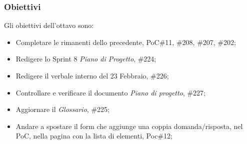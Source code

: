 \subsubsection{Obiettivi}
\label{sec:sprint8_obiettivi}
Gli obiettivi dell'ottavo  sono:
\begin{itemize}
    \item Completare le  rimanenti dello  precedente,  PoC\#11, \#208, \#207, \#202;
    \item Redigere lo Sprint 8 \textit{Piano di Progetto},  \#224;
    \item Redigere il verbale interno del 23 Febbraio,  \#226;
    \item Controllare e verificare il documento \textit{Piano di progetto},  \#227;
    \item Aggiornare il \textit{Glossario},  \#225;
    \item Andare a spostare il form che aggiunge una coppia domanda/risposta, nel PoC, nella pagina con la lista di elementi,  Poc\#12;
\end{itemize}